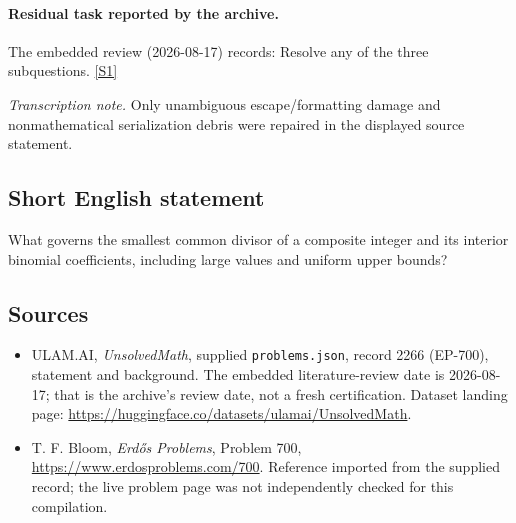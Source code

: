 \documentclass[11pt,a4paper]{article}
\newcommand{\sref}[2]{\hyperlink{source:#1:#2}{[S#2]}}
\begin{document}
\paragraph{Residual task reported by the archive.}

The embedded review (2026-08-17) records: Resolve any of the three subquestions. \sref{2266}{1}

{\small\emph{Transcription note.} Only unambiguous escape/formatting damage and nonmathematical serialization debris were repaired in the displayed source statement.}

\subsection{Short English statement}

What governs the smallest common divisor of a composite integer and its interior binomial coefficients, including large values and uniform upper bounds?

\subsection{Sources}

{\small

\begin{itemize}

\item[\hypertarget{source:2266:1}{S1}] ULAM.AI, \emph{UnsolvedMath}, supplied \texttt{problems.json}, record 2266 (EP-700), statement and background. The embedded literature-review date is 2026-08-17; that is the archive’s review date, not a fresh certification. Dataset landing page: \url{https://huggingface.co/datasets/ulamai/UnsolvedMath}.

\item[\hypertarget{source:2266:2}{S2}] T. F. Bloom, \emph{Erdős Problems}, Problem 700, \url{https://www.erdosproblems.com/700}. Reference imported from the supplied record; the live problem page was not independently checked for this compilation.

\end{itemize}

}

\label{end:2266}
\end{document}
